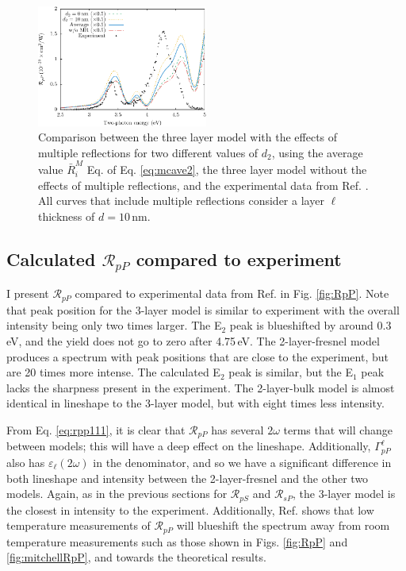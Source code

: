 \begin{figure}[H]
\centering
\includegraphics[width=0.5\textwidth]{content/figures/fig-Si1x1-MRdepth}
\caption{Comparison between the three layer model with the effects of multiple reflections for two different values of $d_{2}$, using the average value $\bar{R}^{M}_{i}$ Eq. of Eq. \eqref{eq:mcave2}, the three layer model without the effects of multiple reflections, and the experimental data from Ref. \cite{mejiaPRB02}. All curves that include multiple reflections consider a layer $\ell$ thickness of $d = 10\,\mathrm{nm}$.}
\label{fig:d2values}
\end{figure}



\subsection{Calculated \texorpdfstring{$\mathcal{R}_{pP}$}{RpP} compared to
experiment}\label{sec:1x1RpP}

I present $\mathcal{R}_{pP}$ compared to experimental data from Ref.
\cite{mejiaPRB02} in Fig. \ref{fig:RpP}. Note that peak position for the 3-layer
model is similar to experiment with the overall intensity being only two times
larger. The E$_{2}$ peak is blueshifted by around 0.3\,eV, and the yield does
not go to zero after 4.75\,eV. The 2-layer-fresnel model produces a spectrum
with peak positions that are close to the experiment, but are 20 times more
intense. The calculated E$_{2}$ peak is similar, but the E$_{1}$ peak lacks the
sharpness present in the experiment. The 2-layer-bulk model is almost identical
in lineshape to the 3-layer model, but with eight times less intensity.

From Eq. \eqref{eq:rpp111}, it is clear that $\mathcal{R}_{pP}$ has several
$2\omega$ terms that will change between models; this will have a deep effect on
the lineshape. Additionally, $\Gamma^{\ell}_{pP}$ also has
$\varepsilon_{\ell}(2\omega)$ in the denominator, and so we have a significant
difference in both lineshape and intensity between the 2-layer-fresnel and the
other two models. Again, as in the previous sections for $\mathcal{R}_{pS}$ and
$\mathcal{R}_{sP}$, the 3-layer model is the closest in intensity to the
experiment. Additionally, Ref. \cite{dadapPRB97} shows that low temperature
measurements of $\mathcal{R}_{pP}$ will blueshift the spectrum away from room
temperature measurements such as those shown in Figs. \ref{fig:RpP} and
\ref{fig:mitchellRpP}, and towards the theoretical results.

